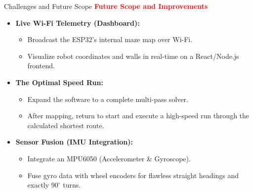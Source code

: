 \documentclass{beamer}
\begin{document}
\begin{frame}{Challenges and Future Scope}
  \transfade[duration=0.1]
  \textcolor{red}{\textbf{\large Future Scope and Improvements}}
  \vspace{0.5em}
  \begin{itemize}[<+->]
    \item \textbf{Live Wi-Fi Telemetry (Dashboard):}
      \begin{itemize}[<+->]
        \item Broadcast the ESP32's internal maze map over Wi-Fi.
        \item Visualize robot coordinates and walls in real-time on a React/Node.js frontend.
      \end{itemize}
    \item \textbf{The Optimal Speed Run:}
      \begin{itemize}[<+->]
        \item Expand the software to a complete multi-pass solver.
        \item After mapping, return to start and execute a high-speed run through the calculated shortest route.
      \end{itemize}
    \item \textbf{Sensor Fusion (IMU Integration):}
      \begin{itemize}[<+->]
        \item Integrate an MPU6050 (Accelerometer \& Gyroscope).
        \item Fuse gyro data with wheel encoders for flawless straight headings and exactly $90^\circ$ turns.
      \end{itemize}
  \end{itemize}
\end{frame}
\end{document}

